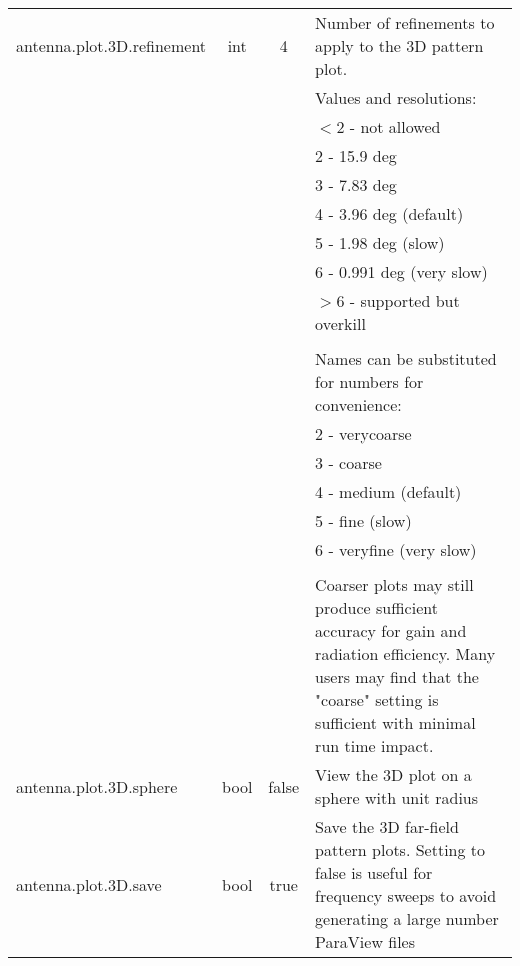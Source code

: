 \documentclass[titlepage]{article}
\renewcommand\_{\textunderscore\linebreak[1]}
\begin{document}
\begin{longtable}[c]{|lccp{8cm}|}
    antenna.plot.3D.refinement    & int    & 4      & Number of refinements to apply to the 3D pattern plot. \\
                                  &        &        &    Values and resolutions: \\
                                  &        &        &      $<$2 - not allowed \\
                                  &        &        &       2 - 15.9 deg \\
                                  &        &        &       3 - 7.83 deg \\
                                  &        &        &       4 - 3.96 deg  (default) \\
                                  &        &        &       5 - 1.98 deg  (slow) \\
                                  &        &        &       6 - 0.991 deg (very slow) \\
                                  &        &        &      $>$6 - supported but overkill \\
                                  &        &        &    \\
                                  &        &        &    Names can be substituted for numbers for convenience: \\
                                  &        &        &       2 - verycoarse \\
                                  &        &        &       3 - coarse \\
                                  &        &        &       4 - medium    (default) \\
                                  &        &        &       5 - fine      (slow) \\
                                  &        &        &       6 - veryfine  (very slow) \\
                                  &        &        &    \\
                                  &        &        &    Coarser plots may still produce sufficient accuracy for gain and radiation efficiency. Many users may find that the "coarse" setting is sufficient with minimal run time impact. \\
    antenna.plot.3D.sphere        & bool   & false  & View the 3D plot on a sphere with unit radius \\ 
    antenna.plot.3D.save          & bool   & true   & Save the 3D far-field pattern plots.  Setting to false is useful for frequency sweeps to avoid generating a large number ParaView files \\

\end{longtable}
\end{document}
